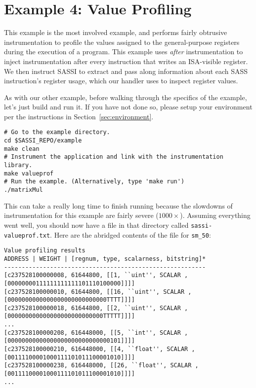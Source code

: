 \pagebreak
\section{Example 4: Value Profiling}
\label{sec:example4}

This example is the most involved example, and performs fairly
obtrusive instrumentation to profile the values assigned to the
general-purpose registers during the execution of a program.  This
example uses \emph{after} instrumentation to inject instrumentation
after every instruction that writes an ISA-visible register.  We then
instruct SASSI to extract and pass along information about each SASS
instruction's register usage, which our handler uses to inspect
register values.

As with our other example, before walking through the specifics of the
example, let's just build and run it. If you have not done so, please
setup your environment per the instructions in
Section~\ref{sec:environment}. 
\begin{lstlisting}[style=BashInputStyle]
# Go to the example directory.
cd $SASSI_REPO/example
make clean
# Instrument the application and link with the instrumentation library.
make valueprof
# Run the example. (Alternatively, type 'make run')
./matrixMul
\end{lstlisting}

This can take a really long time to finish running because the
slowdowns of instrumentation for this example are fairly severe
($1000\times$).  Assuming everything went well, you should now have a
file in that directory called \texttt{sassi-valueprof.txt}.  Here are
the abridged contents of the file for \texttt{sm\_50}:
\begin{verbatim}
Value profiling results
ADDRESS | WEIGHT | [regnum, type, scalarness, bitstring]*
---------------------------------------------------------
[c237528100000008, 61644800, [[1, ``uint'', SCALAR , [00000000111111111111101110100000]]]]
[c237528100000010, 61644800, [[16, ``uint'', SCALAR , [0000000000000000000000000000TTTT]]]]
[c237528100000018, 61644800, [[2, ``uint'', SCALAR , [000000000000000000000000000TTTTT]]]]
...
[c237528100000208, 616448000, [[5, ``int'', SCALAR , [00000000000000000000000000000101]]]]
[c237528100000210, 616448000, [[4, ``float'', SCALAR , [00111100001000111101011100001010]]]]
[c237528100000238, 616448000, [[26, ``float'', SCALAR , [00111100001000111101011100001010]]]]
...
\end{verbatim}


